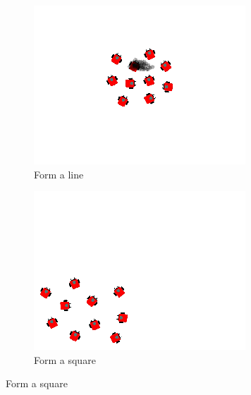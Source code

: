 \documentclass[]{article}
\begin{document}
\begin{figure}
\begin{subfigure}{0.42\textwidth}
		\includegraphics[width=\linewidth]{slide_images/Swarm_Robot_Control_-_10_Robot_0031.png}
		\caption{Form a line}
		\label{fig:sub2}
	\end{subfigure}%
	\begin{subfigure}{0.42\textwidth}
		\centering
		\includegraphics[width=\linewidth]{slide_images/Swarm_Robot_Control_-_10_Robot_0033.png}
		\caption{Form a square}
		\label{fig:sub1}
	\end{subfigure}
\end{figure}
	
\end{document}
